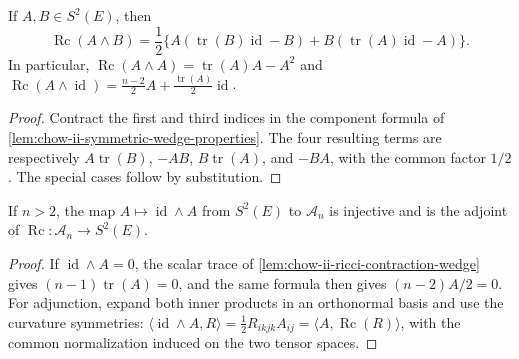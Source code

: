 \begin{lemma}
  \label{lem:chow-ii-ricci-contraction-wedge}
  If \(A,B\in S^2(E)\), then
  \[
  \operatorname{Rc}(A\wedge B)
   =\frac12\{A(\operatorname{tr}(B)\operatorname{id}-B)
             +B(\operatorname{tr}(A)\operatorname{id}-A)\}.
  \]
  In particular,
  \(\operatorname{Rc}(A\wedge A)=\operatorname{tr}(A)A-A^2\) and
  \(\operatorname{Rc}(A\wedge\operatorname{id})
    =\tfrac{n-2}{2}A+\tfrac{\operatorname{tr}(A)}2\operatorname{id}\).
\end{lemma}
\begin{proof}
\sketch
  Contract the first and third indices in the component formula of
  \ref{lem:chow-ii-symmetric-wedge-properties}.  The four resulting terms
  are respectively \(A\operatorname{tr}(B)\), \(-AB\),
  \(B\operatorname{tr}(A)\), and \(-BA\), with the common factor \(1/2\).
  The special cases follow by substitution.
\end{proof}

\begin{lemma}
  \label{lem:chow-ii-wedge-embedding-ricci-adjoint}
  If \(n>2\), the map \(A\mapsto\operatorname{id}\wedge A\) from
  \(S^2(E)\) to \(\mathcal A_n\) is injective and is the adjoint of
  \(\operatorname{Rc}:\mathcal A_n\to S^2(E)\).
\end{lemma}
\begin{proof}
\sketch
  If \(\operatorname{id}\wedge A=0\), the scalar trace of
  \ref{lem:chow-ii-ricci-contraction-wedge} gives
  \((n-1)\operatorname{tr}(A)=0\), and the same formula then gives
  \((n-2)A/2=0\).  For adjunction, expand both inner products in an
  orthonormal basis and use the curvature symmetries:
  \(\langle\operatorname{id}\wedge A,R\rangle
  =\tfrac12R_{ikjk}A_{ij}=\langle A,\operatorname{Rc}(R)\rangle\), with the
  common normalization induced on the two tensor spaces.
\end{proof}

